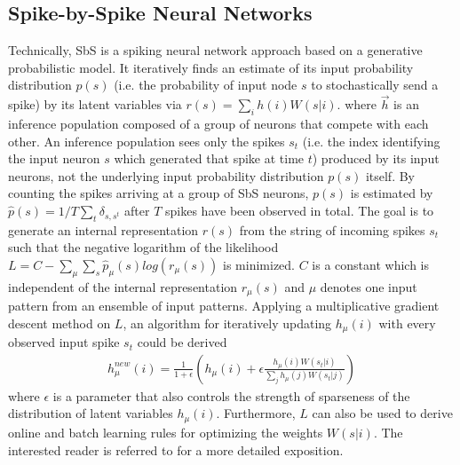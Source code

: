 \subsection{Spike-by-Spike Neural Networks}
\label{sec:sbs}

Technically, SbS is a spiking neural network approach based on a
generative probabilistic model. It iteratively finds an estimate of
its input probability distribution $p(s)$ (i.e. the probability of
input node $s$ to stochastically send a spike) by its latent variables
via $r(s) = \sum_i h(i) W(s|i)$. 
where $\vec{h}$ is an inference
population composed of a group of neurons that compete with each
other. An inference population sees only the spikes $s_t$ (i.e. the
index identifying the input neuron $s$ which generated that spike at
time $t$) produced by its input neurons, not the underlying input
probability distribution $p(s)$ itself. By counting the spikes
arriving at a group of SbS neurons, $p(s)$ is estimated by
$\hat{p}(s) = 1/T \sum_t \delta_{s,s^t}$ after $T$ spikes have been
observed in total. The goal is to generate an internal representation
$r(s)$ from the string of incoming spikes $s_t$ such that the negative
logarithm of the likelihood
$L = C - \sum_\mu \sum_s \hat{p}_\mu(s) log\left( r_\mu(s) \right)$ is
minimized. $C$ is a constant which is independent of the internal
representation $r_\mu(s)$ and $\mu$ denotes one input pattern from an
ensemble of input patterns. Applying a multiplicative gradient descent
method on $L$, an algorithm for iteratively updating $h_\mu(i)$ with
every observed input spike $s_t$ could be derived
\cite{ernst2007efficient}
  \begin{eqnarray} \label{eq:sbs_update}
  h_\mu^{new}(i) = \frac{1}{1+\epsilon} \left(h_\mu(i) + \epsilon \frac{h_\mu(i) W(s_t|i) }{\sum_j h_\mu(j) W(s_t|j)} \right) 
  \end{eqnarray}
  where $\epsilon$ is a parameter that also controls the strength of sparseness of the distribution of latent variables $h_\mu(i)$. Furthermore, $L$ can also be used to derive online and batch learning rules for optimizing the weights $W(s|i)$. The interested reader is referred to \cite{ernst2007efficient} for a more detailed exposition.


